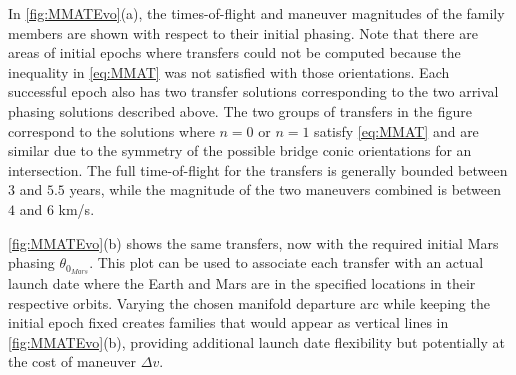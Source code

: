 In \cref{fig:MMATEvo}(a), the times-of-flight and maneuver magnitudes of the family members are
shown with respect to their initial phasing. Note that there are areas of initial epochs where
transfers could not be computed because the inequality in \cref{eq:MMAT} was not satisfied with
those orientations. Each successful epoch also has two transfer solutions corresponding to the two
arrival phasing solutions described above. The two groups of transfers in the figure correspond to 
the solutions where $n=0$ or $n=1$ satisfy \cref{eq:MMAT} and are similar due to the symmetry of
the possible bridge conic orientations for an intersection. The full time-of-flight for the
transfers is generally bounded between $3$ and $5.5$ years, while the magnitude of the two
maneuvers combined is between $4$ and $6$ km/s.

\cref{fig:MMATEvo}(b) shows the same transfers, now with the required initial Mars phasing
$\theta_{0_{Mars}}$. This plot can be used to associate each transfer with an actual launch date
where the Earth and Mars are in the specified locations in their respective orbits. Varying the
chosen manifold departure arc while keeping the initial epoch fixed creates families that would
appear as vertical lines in \cref{fig:MMATEvo}(b), providing additional launch date flexibility but
potentially at the cost of maneuver $\Delta v$.

